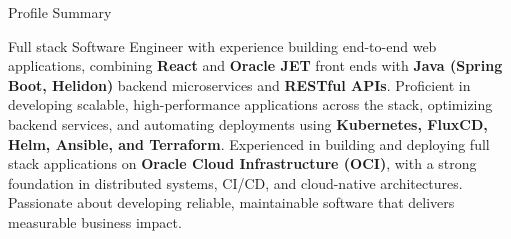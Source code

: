 \documentclass{resume}
\begin{document}
\begin{rSection}{Profile Summary}

Full stack Software Engineer with experience building end-to-end web applications, combining \textbf{React} and \textbf{Oracle JET} front ends with \textbf{Java (Spring Boot, Helidon)} backend microservices and \textbf{RESTful APIs}. Proficient in developing scalable, high-performance applications across the stack, optimizing backend services, and automating deployments using \textbf{Kubernetes, FluxCD, Helm, Ansible, and Terraform}. Experienced in building and deploying full stack applications on \textbf{Oracle Cloud Infrastructure (OCI)}, with a strong foundation in distributed systems, CI/CD, and cloud-native architectures. Passionate about developing reliable, maintainable software that delivers measurable business impact.

\end{rSection}
\end{document}

